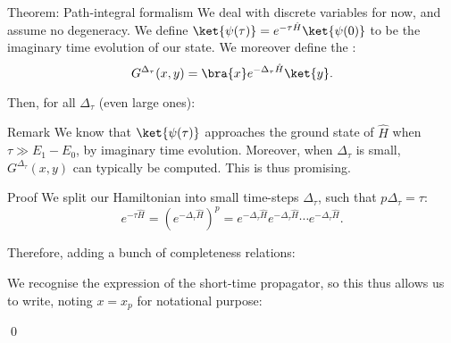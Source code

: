 \documentclass[a4paper]{article}
\begin{document}
\begin{parag}{Theorem: Path-integral formalism}
    We deal with discrete variables for now, and assume no degeneracy. We define $\ket{\psi\left(\tau\right)} = e^{-\tau \hat{H}} \ket{\psi\left(0\right)}$ to be the imaginary time evolution of our state. We moreover define the :
    \[G^{\Delta_{\tau}}\left(x, y\right) = \bra{x} e^{-\Delta_{\tau} \hat{H}} \ket{y}.\]

    Then, for all $\Delta_{\tau}$ (even large ones):

    \begin{subparag}{Remark}
        We know that $\ket{\psi\left(\tau\right)}$ approaches the ground state of $\hat{H}$ when $\tau \gg E_1 - E_0$, by imaginary time evolution. Moreover, when $\Delta_{\tau}$ is small, $G^{\Delta_{\tau}}\left(x, y\right)$ can typically be computed. This is thus promising.
    \end{subparag}

    \begin{subparag}{Proof}
        We split our Hamiltonian into small time-steps $\Delta_{\tau}$, such that $p \Delta_{\tau} = \tau$:
        \[e^{-\tau \hat{H}} = \left(e^{- \Delta_{\tau} \hat{H}}\right)^p = e^{-\Delta_{\tau} \hat{H}} e^{-\Delta_{\tau} \hat{H}} \cdots e^{-\Delta_{\tau} \hat{H}}.\]

        Therefore, adding a bunch of completeness relations: 
        
        We recognise the expression of the short-time propagator, so this thus allows us to write, noting $x = x_p$ for notational purpose: 
        
        \qed
    \end{subparag}
\end{parag}
\end{document}
